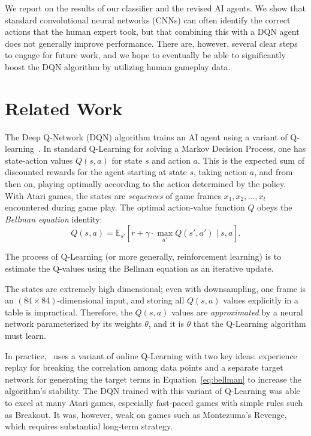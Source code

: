 \documentclass[letterpaper, 10pt, conference]{ieeeconf}
\begin{document}
We report on the results of our classifier and the revised AI agents. We show
that standard convolutional neural networks (CNNs) can often identify the
correct actions that the human expert took, but that combining this with a DQN
agent does not generally improve performance. There are, however, several clear
steps to engage for future work, and we hope to eventually be able to
significantly boost the DQN algorithm by utilizing human gameplay data.




\section{Related Work}\label{sec:related_work}

The Deep Q-Network (DQN) algorithm trains an AI agent using a variant of
Q-learning~\cite{Sutton_1998}. In standard Q-Learning for solving a Markov
Decision Process, one has state-action values $Q(s,a)$ for state $s$ and action
$a$. This is the expected sum of discounted rewards for the agent starting at
state $s$, taking action $a$, and from then on, playing optimally according to
the action determined by the policy.  With Atari games, the states are
\emph{sequences} of game frames $x_1,x_2,\ldots,x_t$ encountered during game
play. The optimal action-value function $Q$ obeys the \emph{Bellman equation}
identity: 
\begin{equation}\label{eq:bellman}
Q(s,a) = \mathbb{E}_{s'}\left[r + \gamma \cdot \max_{a'} Q(s',a') \mid s,a \right].
\end{equation}

The process of Q-Learning (or more generally, reinforcement learning) is to
estimate the Q-values using the Bellman equation as an iterative update.

The states are extremely high dimensional; even with downsampling, one frame is
an $(84\times 84)$-dimensional input, and storing all $Q(s,a)$ values explicitly
in a table is impractical.  Therefore, the $Q(s,a)$ values are
\emph{approximated} by a neural network parameterized by its weights $\theta$,
and it is $\theta$ that the Q-Learning algorithm must learn.

In practice,~\cite{mnih-dqn-2015} uses a variant of online Q-Learning with two
key ideas: experience replay for breaking the correlation among data points and
a separate target network for generating the target terms in
Equation~\ref{eq:bellman} to increase the algorithm's stability. The DQN trained
with this variant of Q-Learning was able to excel at many Atari games,
especially fast-paced games with simple rules such as Breakout. It was, however,
weak on games such as Montezuma's Revenge, which requires substantial long-term
strategy.
\end{document}

